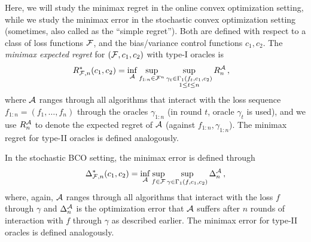 Here, we will study the minimax regret in the online convex optimization setting, 
 while we study the minimax error in the stochastic convex optimization setting (sometimes, also called as the ``simple regret'').
Both are defined with respect to a class of loss functions $\mathcal{F}$, and the bias/variance control functions $c_1,c_2$.
The \emph{minimax expected regret} for $(\mathcal{F},c_1,c_2)$ with type-I oracles is
\begin{align*}
R_{\F,n}^*(c_1,c_2)
&= \inf_{\cA} \sup_{f_{1:n}\in \cF^n}
	\sup_{\substack{\gamma_t \in \Gamma_1(f_t,c_1,c_2)\\1\le t \le n
	}} R_n^{\cA}\,, %
\end{align*}
where $\mathcal{A}$ ranges through all algorithms that interact with the loss sequence  $f_{1:n}= (f_1,\dots,f_n)$
through the oracles $\gamma_{1:n}$ (in round $t$, oracle $\gamma_t$ is used),
and we use $R_n^{\mathcal{A}}$ to denote the expected regret of $\mathcal{A}$ (against $f_{1:n},\gamma_{1:n}$).
The minimax regret for type-II oracles is defined analogously.

In the stochastic BCO setting, the minimax error is defined through
\begin{align}
\label{eq:minimaxerrdef}
\Delta_{\F,n}^*(c_1,c_2)
= \inf_{\cA} \sup_{f \in \cF} \sup_{\gamma\in \Gamma_1(f,c_1,c_2)}  \Delta_n^{\cA}\,, %
\end{align}
where, again, $\mathcal{A}$ ranges through all algorithms that interact with the loss $f$ through $\gamma$ and
$\Delta_n^{\mathcal{A}}$ is the optimization error that $\mathcal{A}$ suffers
after $n$ rounds of interaction with $f$ through $\gamma$ as described earlier.
The minimax error for type-II oracles is defined analogously.

